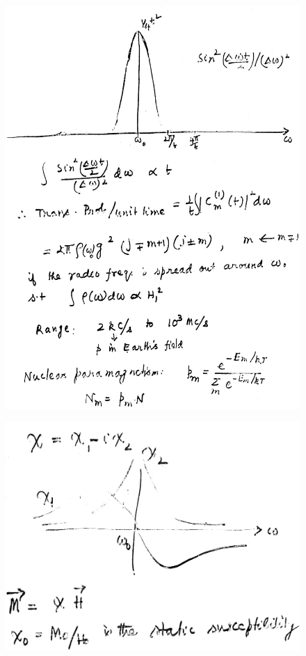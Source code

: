 \begin{figure}[H]
\centering
\includegraphics[scale=0.48]{src/images/chap8/6.eps}
\end{figure}
\begin{figure}[H]
\centering
\includegraphics[scale=0.26]{src/images/chap8/7.eps}
\end{figure}
\vskip 1cm

